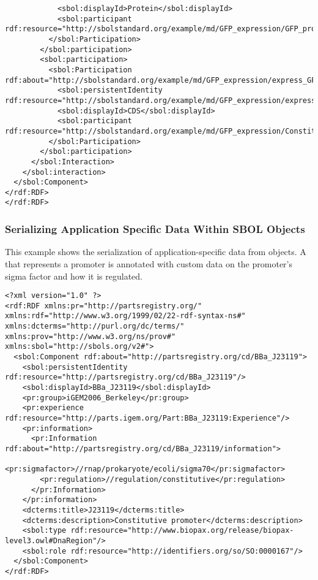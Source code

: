 \begin{lstlisting}
            <sbol:displayId>Protein</sbol:displayId>
            <sbol:participant rdf:resource="http://sbolstandard.org/example/md/GFP_expression/GFP_protein"/>
          </sbol:Participation>
        </sbol:participation>
        <sbol:participation>
          <sbol:Participation rdf:about="http://sbolstandard.org/example/md/GFP_expression/express_GFP/CDS">
            <sbol:persistentIdentity rdf:resource="http://sbolstandard.org/example/md/GFP_expression/express_GFP/CDS"/>
            <sbol:displayId>CDS</sbol:displayId>
            <sbol:participant rdf:resource="http://sbolstandard.org/example/md/GFP_expression/Constitutive_GFP"/>
          </sbol:Participation>
        </sbol:participation>
      </sbol:Interaction>
    </sbol:interaction>
  </sbol:Component>
</rdf:RDF>
</rdf:RDF>
\end{lstlisting}

\subsubsection{Serializing Application Specific Data Within SBOL Objects}
This example shows the serialization of application-specific data from  objects. A\\
 that represents a promoter is annotated with custom data on the promoter's sigma factor and how it is regulated.
\begin{lstlisting}
<?xml version="1.0" ?>
<rdf:RDF xmlns:pr="http://partsregistry.org/" xmlns:rdf="http://www.w3.org/1999/02/22-rdf-syntax-ns#" xmlns:dcterms="http://purl.org/dc/terms/" xmlns:prov="http://www.w3.org/ns/prov#" xmlns:sbol="http://sbols.org/v2#">
  <sbol:Component rdf:about="http://partsregistry.org/cd/BBa_J23119">
    <sbol:persistentIdentity rdf:resource="http://partsregistry.org/cd/BBa_J23119"/>
    <sbol:displayId>BBa_J23119</sbol:displayId>
    <pr:group>iGEM2006_Berkeley</pr:group>
    <pr:experience rdf:resource="http://parts.igem.org/Part:BBa_J23119:Experience"/>
    <pr:information>
      <pr:Information rdf:about="http://partsregistry.org/cd/BBa_J23119/information">
        <pr:sigmafactor>//rnap/prokaryote/ecoli/sigma70</pr:sigmafactor>
        <pr:regulation>//regulation/constitutive</pr:regulation>
      </pr:Information>
    </pr:information>
    <dcterms:title>J23119</dcterms:title>
    <dcterms:description>Constitutive promoter</dcterms:description>
    <sbol:type rdf:resource="http://www.biopax.org/release/biopax-level3.owl#DnaRegion"/>
    <sbol:role rdf:resource="http://identifiers.org/so/SO:0000167"/>
  </sbol:Component>
</rdf:RDF>
\end{lstlisting}

